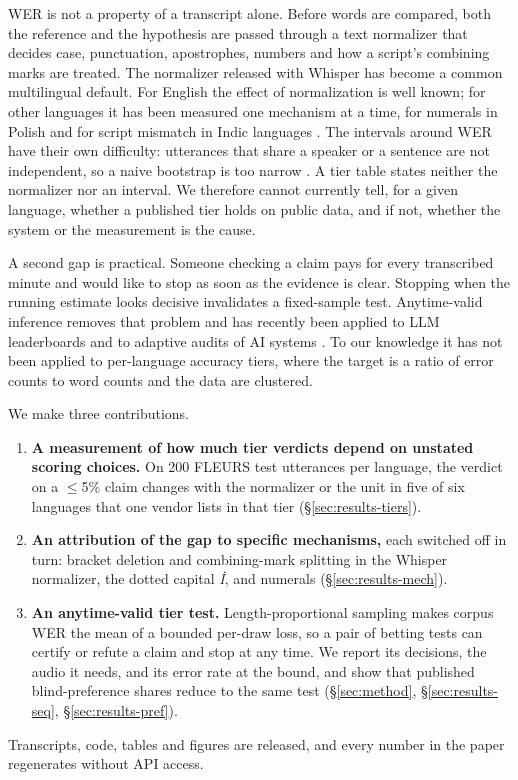 WER is not a property of a transcript alone. Before words are compared, both the reference and the hypothesis are passed through a text normalizer that decides case, punctuation, apostrophes, numbers and how a script's combining marks are treated. The normalizer released with Whisper \citep{radford2022whisper} has become a common multilingual default. For English the effect of normalization is well known; for other languages it has been measured one mechanism at a time, for numerals in Polish \citep{kacprzak2026digits} and for script mismatch in Indic languages \citep{pattnayak2026snwer}. The intervals around WER have their own difficulty: utterances that share a speaker or a sentence are not independent, so a naive bootstrap is too narrow \citep{liu2019blockwise,liu2022dependent}. A tier table states neither the normalizer nor an interval. We therefore cannot currently tell, for a given language, whether a published tier holds on public data, and if not, whether the system or the measurement is the cause.

A second gap is practical. Someone checking a claim pays for every transcribed minute and would like to stop as soon as the evidence is clear. Stopping when the running estimate looks decisive invalidates a fixed-sample test. Anytime-valid inference removes that problem and has recently been applied to LLM leaderboards \citep{gao2026anytime} and to adaptive audits of AI systems \citep{zhou2026adaptive}. To our knowledge it has not been applied to per-language accuracy tiers, where the target is a ratio of error counts to word counts and the data are clustered.

We make three contributions.
\begin{enumerate}
  \item \textbf{A measurement of how much tier verdicts depend on unstated scoring choices.} On 200 FLEURS test utterances per language, the verdict on a $\le$5\% claim changes with the normalizer or the unit in five of six languages that one vendor lists in that tier (\S\ref{sec:results-tiers}).
  \item \textbf{An attribution of the gap to specific mechanisms,} each switched off in turn: bracket deletion and combining-mark splitting in the Whisper normalizer, the dotted capital \emph{\.I}, and numerals (\S\ref{sec:results-mech}).
  \item \textbf{An anytime-valid tier test.} Length-proportional sampling makes corpus WER the mean of a bounded per-draw loss, so a pair of betting tests \citep{waudbysmith2020betting} can certify or refute a claim and stop at any time. We report its decisions, the audio it needs, and its error rate at the bound, and show that published blind-preference shares reduce to the same test (\S\ref{sec:method}, \S\ref{sec:results-seq}, \S\ref{sec:results-pref}).
\end{enumerate}
Transcripts, code, tables and figures are released, and every number in the paper regenerates without API access.

